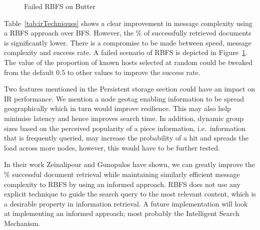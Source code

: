 \begin{figure}[ht]
    \centering
    
    \caption{Failed RBFS on Butter}
    \label{fig:failedRBFS}
\end{figure}

Table~\ref{tab:irTechniques} shows a clear improvement in message complexity using a RBFS approach over BFS. However, the \% of successfully retrieved documents is significantly lower. There is a compromise to be made between speed, message complexity and success rate. A failed scenario of RBFS is depicted in Figure~\ref{fig:failedRBFS}. The value of the proportion of known hosts selected at random could be tweaked from the default $0.5$ to other values to improve the success rate.

Two features mentioned in the Persistent storage section could have an impact on IR performance. We mention a node geotag enabling information to be spread geographically which in turn would improve resilience. This may also help minimise latency and hence improves search time. In addition, dynamic group sizes based on the perceived popularity of a piece information, i.e.\ information that is frequently queried, may increase the probability of a hit and spreads the load across more nodes, however, this would have to be further tested.

In their work Zeinalipour and Gunopulos\cite{zeinalipour2004information} have shown, we can greatly improve the \% successful document retrieval while maintaining similarly efficient message complexity to RBFS by using an informed approach. RBFS does not use any explicit technique to guide the search query to the most relevant content, which is a desirable property in information retrieval. A future implementation will look at implementing an informed approach; most probably the Intelligent Search Mechanism.

